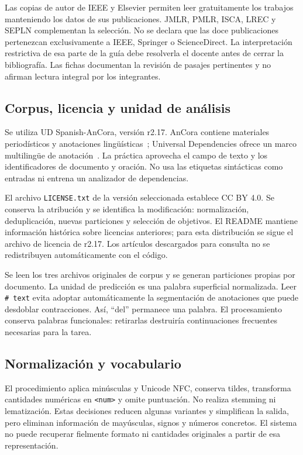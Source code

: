 Las copias de autor de IEEE y Elsevier permiten leer gratuitamente los
trabajos manteniendo los datos de sus publicaciones. JMLR, PMLR, ISCA,
LREC y SEPLN complementan la selección. No se declara que las doce
publicaciones pertenezcan exclusivamente a IEEE, Springer o ScienceDirect.
La interpretación restrictiva de esa parte de la guía debe resolverla el
docente antes de cerrar la bibliografía. Las fichas documentan la revisión
de pasajes pertinentes y no afirman lectura integral por los integrantes.

\subsection{Corpus, licencia y unidad de análisis}
Se utiliza UD Spanish-AnCora, versión r2.17. AnCora contiene materiales
periodísticos y anotaciones lingüísticas~\cite{taule2008}; Universal
Dependencies ofrece un marco multilingüe de anotación~\cite{nivre2020}.
La práctica aprovecha el campo de texto y los identificadores de
documento y oración. No usa las etiquetas sintácticas como entradas ni
entrena un analizador de dependencias.

El archivo \texttt{LICENSE.txt} de la versión seleccionada establece
CC BY 4.0. Se conserva la atribución y se identifica la modificación:
normalización, deduplicación, nuevas particiones y selección de objetivos.
El README mantiene información histórica sobre licencias anteriores;
para esta distribución se sigue el archivo de licencia de r2.17.
Los artículos descargados para consulta no se redistribuyen
automáticamente con el código.

Se leen los tres archivos originales de corpus y se generan particiones
propias por documento. La unidad de predicción es una palabra superficial
normalizada. Leer \texttt{\# text} evita adoptar automáticamente la
segmentación de anotaciones que puede desdoblar contracciones. Así,
``del'' permanece una palabra. El procesamiento conserva palabras
funcionales: retirarlas destruiría continuaciones frecuentes necesarias
para la tarea.

\subsection{Normalización y vocabulario}
El procedimiento aplica minúsculas y Unicode NFC, conserva tildes,
transforma cantidades numéricas en \texttt{<num>} y omite puntuación.
No realiza stemming ni lematización. Estas decisiones reducen algunas
variantes y simplifican la salida, pero eliminan información de mayúsculas,
signos y números concretos. El sistema no puede recuperar fielmente
formato ni cantidades originales a partir de esa representación.

